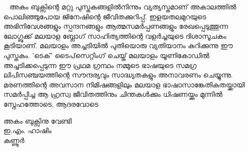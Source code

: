 ﻿~
\vfill
അകം ബുക്സിന്റെ മറ്റു പുസ്തകങ്ങളില്‍നിന്നും വ്യത്യസ്തമാണ് അകാലത്തില്‍ പൊലിഞ്ഞുപോയ ജിനേഷിന്റെ ജീവിതക്കുറിപ്പ്. ഇളയതലമുറയുടെ അഭിനിവേശങ്ങളും സ്പന്ദനങ്ങളും ആത്മസമര്‍പ്പണങ്ങളും രേഖപ്പെടുത്തുന്ന ലോഗ്ബുക്ക് മലയാള ബ്ലോഗ് സാഹിത്യത്തിന്റെ വളര്‍ച്ചയുടെ ദിശാസൂചകം കൂടിയാണ്. മലയാളം അച്ചടിയില്‍ പുതിയൊരു വ്യതിയാനം കുറിക്കുന്നു ഈ പുസ്തകം. 'ടെക്‍' ടൈപ്‌സെറ്റിംഗ് ചെയ്ത് മലയാളം യൂണികോഡില്‍ അച്ചടിക്കപ്പെടുന്ന ഈ പ്രഥമ ഗ്രന്ഥം നമ്മുടെ ഭാഷയുടെ സമഗ്ര ലിപിസഞ്ചയത്തിന്റെ സൗന്ദര്യവും സാദ്ധ്യതകളും അനാവരണം ചെയ്യുന്നു. മരണത്തിന്റെ അവസാന നിമിഷങ്ങളിലും മലയാള ഭാഷാസാങ്കേതികതയ്ക്കായി സമര്‍പ്പിച്ച ആ ഹ്രസ്വ ജീവിതത്തിനും ചിന്തകള്‍ക്കും ധിഷണയ്ക്കും മുന്നില്‍ സ്നേഹത്തോടെ, ആദരവോടെ

\begin{flushright}അകം ബുക്സിനു വേണ്ടി \\
ഇ.എം. ഹാഷിം \\
കണ്ണൂര്‍ \\ \end{flushright}
\vfill
\newpage

